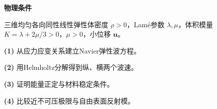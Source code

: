 \textbf{物理条件}\par 三维均匀各向同性线性弹性体密度 \(\rho>0\)，Lamé参数 \(\lambda,\mu\)，体积模量 \(K=\lambda+2\mu/3>0\)，\(\mu>0\)，小位移 \(\boldsymbol u\)。
\par\noindent\textbf{(1)} 从应力应变关系建立Navier弹性波方程。
\par\noindent\textbf{(2)} 用Helmholtz分解得到纵、横两个波速。
\par\noindent\textbf{(3)} 证明能量正定与材料稳定条件。
\par\noindent\textbf{(4)} 比较近不可压极限与自由表面反射模。
